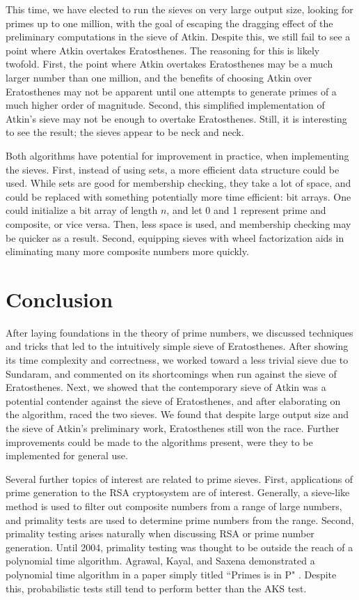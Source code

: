 \documentclass{amsart}
\theoremstyle{definition}
\theoremstyle{case}
\begin{document}
	This time, we have elected to run the sieves on very large output size, looking for primes up to one million, with the goal of escaping the dragging effect of the preliminary computations in the sieve of Atkin. Despite this, we still fail to see a point where Atkin overtakes Eratosthenes. The reasoning for this is likely twofold. First, the point where Atkin overtakes Eratosthenes may be a much larger number than one million, and the benefits of choosing Atkin over Eratosthenes may not be apparent until one attempts to generate primes of a much higher order of magnitude. Second, this simplified implementation of Atkin's sieve may not be enough to overtake Eratosthenes. Still, it is interesting to see the result; the sieves appear to be neck and neck.
	
	Both algorithms have potential for improvement in practice, when implementing the sieves. First, instead of using sets, a more efficient data structure could be used. While sets are good for membership checking, they take a lot of space, and could be replaced with something potentially more time efficient: bit arrays. One could initialize a bit array of length $n$, and let 0 and 1 represent prime and composite, or vice versa. Then, less space is used, and membership checking may be quicker as a result. Second, equipping sieves with wheel factorization aids in eliminating many more composite numbers more quickly.
	
	\section{Conclusion}
	
	After laying foundations in the theory of prime numbers, we discussed techniques and tricks that led to the intuitively simple sieve of Eratosthenes. After showing its time complexity and correctness, we worked toward a less trivial sieve due to Sundaram, and commented on its shortcomings when run against the sieve of Eratosthenes. Next, we showed that the contemporary sieve of Atkin was a potential contender against the sieve of Eratosthenes, and after elaborating on the algorithm, raced the two sieves. We found that despite large output size and the sieve of Atkin's preliminary work, Eratosthenes still won the race. Further improvements could be made to the algorithms present, were they to be implemented for general use. 
	
	Several further topics of interest are related to prime sieves. First, applications of prime generation to the RSA cryptosystem are of interest. Generally, a sieve-like method is used to filter out composite numbers from a range of large numbers, and primality tests are used to determine prime numbers from the range. Second, primality testing arises naturally when discussing RSA or prime number generation. Until 2004, primality testing was thought to be outside the reach of a polynomial time algorithm. Agrawal, Kayal, and Saxena demonstrated a polynomial time algorithm in a paper simply titled ``Primes is in P" \cite{MR2123939}. Despite this, probabilistic tests still tend to perform better than the AKS test.
	
\end{document}

